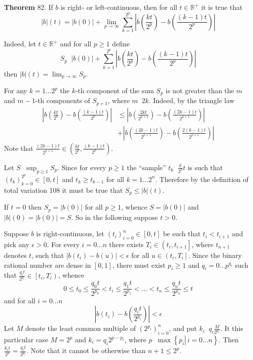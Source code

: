 \documentclass[a4paper]{article}
\newcommand{\obj}[1]{\left\{ #1 \right \}}
\newcommand{\clo}[1]{\left [ #1 \right ]}
\newcommand{\clop}[1]{\left [ #1 \right )}
\newcommand{\ploc}[1]{\left ( #1 \right ]}
\newcommand{\brac}[1]{\left ( #1 \right )}
\newcommand{\induc}[1]{\left . #1 \right \vert}
\newcommand{\abs}[1]{\left | #1 \right |}
\newcommand{\Real}{\mathbb{R}}
\newcommand{\defn}{\mathop{\overset{\Delta}{=}}\nolimits}
\begin{document}
\label{thm:tot_var_dense_calc}\noindent\textbf{Theorem} 82.
If $b$ is right- or left-continuous, then for all $t\in\Real^+$ it is true that \[\abs{b}\brac{t}=\abs{b\brac{0}} + \lim_{p\to\infty} \sum_{k=1}^{2^p}\abs{b\brac{\frac{k t}{2^p}}-b\brac{\frac{\brac{k-1} t}{2^p}}}\]

Indeed, let $t\in \Real^+$ and for all $p\geq 1$ define \[S_p\defn \abs{b\brac{0}} + \sum_{k=1}^{2^p}\abs{b\brac{\frac{k t}{2^p}}-b\brac{\frac{\brac{k-1} t}{2^p}}}\] then $\abs{b}\brac{t}=\lim_{p\to \infty} S_p$.

For any $k=1\ldots 2^p$ the $k$-th component of the sum $S_p$ is not greater than the $m$ and $m-1$-th components of $S_{p+1}$, where $m\defn 2k$. Indeed, by the triangle law \begin{align*}\abs{b\brac{\frac{k t}{2^p}}-b\brac{\frac{\brac{k-1} t}{2^p}}}&\leq \abs{b\brac{\frac{2 k t}{2^{p+1}}}-b\brac{\frac{\brac{2k-1} t}{2^{p+1}}}}\\&+\abs{b\brac{\frac{\brac{2k-1} t}{2^{p+1}}}-b\brac{\frac{2\brac{k-1} t}{2^{p+1}}}}\end{align*} Note that $\frac{\brac{2k-1}t}{2^{p+1}}\in \brac{\frac{k t}{2^p}, \frac{\brac{k-1} t}{2^p}}$.

Let $S\defn \sup_{p\geq1} S_p$. Since for every $p\geq1$ the ``sample'' $t_k\defn \frac{k}{2^p}t$ is such that $\brac{t_k}_{k=0}^{2^p}\in \clo{0,t}$ and $t_k\geq t_{k-1}$ for all $k=1\ldots{2^n}$. Therefore by the definition of total variation 108 it must be true that $S_p\leq \abs{b}\brac{t}$.

If $t=0$ then $S_p=\abs{b\brac{0}}$ for all $p\geq1$, whence $S=\abs{b\brac{0}}$ and $\abs{b}\brac{0}=\abs{b\brac{0}}=S$. So in the following suppose $t>0$.

Suppose $b$ is right-continuous, let $\brac{t_i}_{i=0}^n\in\clo{0,t}$ be such that $t_i<t_{i+1}$ and pick any $\epsilon>0$. For every $i=0\ldots n$ there exists $T_i\in\ploc{t_i,t_{i+1}}$, where $t_{n+1}$ denotes $t$, such that $\abs{b\brac{t_i}-b\brac{u}}<\epsilon$ for all $u\in\ploc{t_i,T_i}$. Since the binary rational number are dense in $\clo{0,1}$, there must exist $p_i\geq1$ and $q_i=0\ldots {p^{q_i}}$ such that $\frac{q_i t}{2^{p_i}}\in \clop{t_i,T_i}$, whence \[0\leq t_0\leq \frac{q_0 t}{2^{p_0}}<t_i\leq \frac{q_1 t}{2^{p_1}}<\ldots<t_n\leq \frac{q_n t}{2^{p_n}}\leq t\] and for all $i=0\ldots n$ \[\abs{b\brac{t_i}-b\brac{\frac{q_i t}{2^{p_i}}}}<\epsilon\] Let $M$ denote the least common multiple of $\brac{2^{p_i}}_{i=0}^n$, and put $k_i\defn q_i \frac{M}{2^{p_i}}$. It this particular case $M=2^p$ and $k_i=q_i 2^{p-p_i}$, where $p\defn\max\obj{\induc{p_i}\,i=0\dots n}$. Then $\frac{k_i t}{2^p} = \frac{q_i t}{2^{p_i}}$. Note that it cannot be otherwise than $n+1\leq 2^p$.
\end{document}

